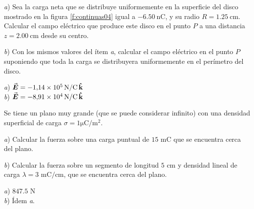 %
\begin{center}
\end{center}
%
\begin{Exercise}
  \textit{a}) Sea la carga neta que se distribuye uniformemente en la superficie del disco mostrado en la figura \ref{f:continuas04} igual a $\SI{-6.50}{\nano\coulomb}$, y su radio $R = \SI{1.25}{\centi\metre}$. Calcular el campo eléctrico que produce este disco en el punto $P$ a una distancia $z = \SI{2.00}{\centi\metre}$ desde su centro.\par\medskip
  \textit{b}) Con los mismos valores del ítem \textit{a}, calcular el campo eléctrico en el punto $P$ suponiendo que toda la carga se distribuyera uniformemente en el perímetro del disco.
\end{Exercise}
\begin{Answer}
  \begin{minipage}[t]{.4\textwidth}
    \textit{a}) $\va*{E} = \SI{-1.14E5}{\newton/\coulomb}\,\vu{k}$\\ \textit{b}) $\va*{E} = \SI{-8.91E4}{\newton/\coulomb}\,\vu{k}$
  \end{minipage}
\end{Answer}
%
\begin{Exercise}
  Se tiene un plano muy grande (que se puede considerar infinito) con una densidad superficial de carga $\sigma = 1\mathrm{ \mu C/m^2}$.\par\medskip
  \textit{a}) Calcular la fuerza sobre una carga puntual de $15\text{ mC}$ que se encuentra cerca del plano.\par\medskip 
  \textit{b}) Calcular la fuerza sobre un segmento de longitud $5\text{ cm}$ y densidad lineal de carga $\lambda = 3\text{ mC/cm}$, que se encuentra cerca del plano.
\end{Exercise}
\begin{Answer}
  \begin{minipage}[t]{.4\textwidth}
    \textit{a}) $847.5\text{ N}$\\
    \textit{b}) Ídem \textit{a}.
  \end{minipage}
\end{Answer}
%

